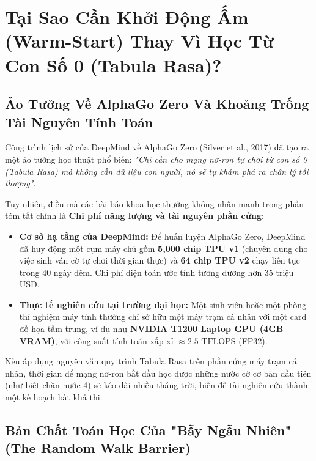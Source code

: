 \documentclass[11pt,a4paper]{report}
\begin{document}
\tableofcontents
\newpage
{}

\chapter{Tại Sao Cần Khởi Động Ấm (Warm-Start) Thay Vì Học Từ Con Số 0 (Tabula Rasa)?}

\section{Ảo Tưởng Về AlphaGo Zero Và Khoảng Trống Tài Nguyên Tính Toán}

Công trình lịch sử của DeepMind về AlphaGo Zero (Silver et al., 2017) đã tạo ra một ảo tưởng học thuật phổ biến: \textit{"Chỉ cần cho mạng nơ-ron tự chơi từ con số 0 (Tabula Rasa) mà không cần dữ liệu con người, nó sẽ tự khám phá ra chân lý tối thượng"}.

Tuy nhiên, điều mà các bài báo khoa học thường không nhấn mạnh trong phần tóm tắt chính là \textbf{Chi phí năng lượng và tài nguyên phần cứng}:
\begin{itemize}
    \item \textbf{Cơ sở hạ tầng của DeepMind:} Để huấn luyện AlphaGo Zero, DeepMind đã huy động một cụm máy chủ gồm \textbf{5,000 chip TPU v1} (chuyên dụng cho việc sinh ván cờ tự chơi thời gian thực) và \textbf{64 chip TPU v2} chạy liên tục trong 40 ngày đêm. Chi phí điện toán ước tính tương đương hơn $35$ triệu USD.
    \item \textbf{Thực tế nghiên cứu tại trường đại học:} Một sinh viên hoặc một phòng thí nghiệm máy tính thường chỉ sở hữu một máy trạm cá nhân với một card đồ họa tầm trung, ví dụ như \textbf{NVIDIA T1200 Laptop GPU (4GB VRAM)}, với công suất tính toán xấp xỉ $\approx 2.5\text{ TFLOPS}$ (FP32).
\end{itemize}

Nếu áp dụng nguyên văn quy trình Tabula Rasa trên phần cứng máy trạm cá nhân, thời gian để mạng nơ-ron bắt đầu học được những nước cờ cơ bản đầu tiên (như biết chặn nước 4) sẽ kéo dài nhiều tháng trời, biến đề tài nghiên cứu thành một kế hoạch bất khả thi.

\section{Bản Chất Toán Học Của "Bẫy Ngẫu Nhiên" (The Random Walk Barrier)}
\end{document}
